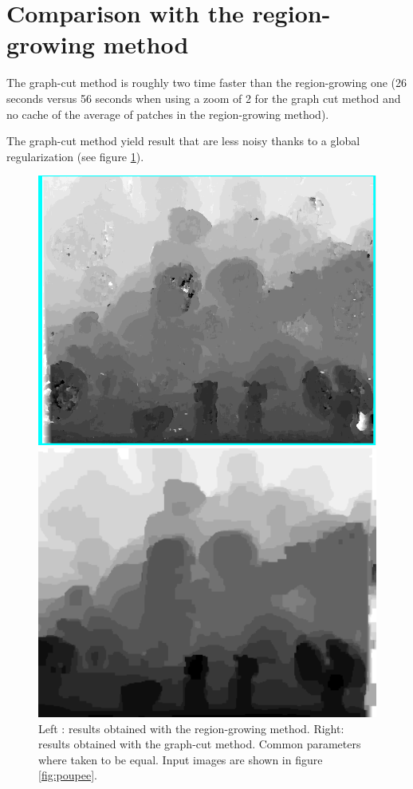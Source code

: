 \documentclass[]{article}
\begin{document}
\section*{Comparison with the region-growing method}
The graph-cut method is roughly two time faster than the region-growing one (26 seconds versus 56 seconds when using a zoom of 2 for the graph cut method and no cache of the average of patches in the region-growing method).

The graph-cut method yield result that are less noisy thanks to a global regularization (see figure \ref{fig:comp_poup}).
\begin{figure}[h]
	\centering
	\begin{minipage}{0.48\linewidth}
		\includegraphics[width=\linewidth]{results/poup_monasse.png}
	\end{minipage}\hfill
	\begin{minipage}{0.48\linewidth}
		\includegraphics[width=\linewidth]{results/poup_same.png}
	\end{minipage}
	\caption{Left : results obtained with the region-growing method. Right: results obtained with the graph-cut method. Common parameters where taken to be equal. Input images are shown in figure \ref{fig:poupee}.}
	\label{fig:comp_poup}
\end{figure} 
\end{document}
